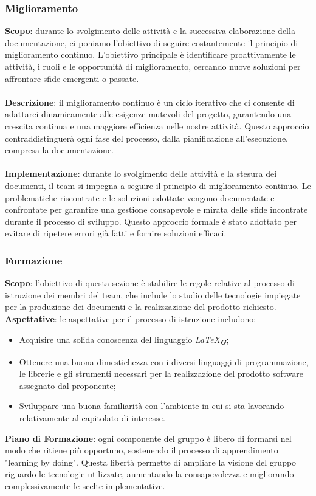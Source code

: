 \subsubsection{Miglioramento}
\textbf{Scopo}: durante lo svolgimento delle attività e la successiva elaborazione della documentazione, ci poniamo l'obiettivo di seguire costantemente il principio di miglioramento continuo. 
L'obiettivo principale è identificare proattivamente le attività, i ruoli e le opportunità di miglioramento, cercando nuove soluzioni per affrontare sfide emergenti o passate.\\ \\
\textbf{Descrizione}: il miglioramento continuo è un ciclo iterativo che ci consente di adattarci dinamicamente alle esigenze mutevoli del progetto, 
garantendo una crescita continua e una maggiore efficienza nelle nostre attività.
Questo approccio contraddistinguerà ogni fase del processo, dalla pianificazione all'esecuzione, compresa la documentazione.\\ \\
\textbf{Implementazione}: durante lo svolgimento delle attività e la stesura dei documenti, il team si impegna a seguire il principio di miglioramento continuo. 
Le problematiche riscontrate e le soluzioni adottate vengono documentate e confrontate per garantire una gestione consapevole e mirata delle sfide incontrate durante il processo di sviluppo. 
Questo approccio formale è stato adottato per evitare di ripetere errori già fatti e fornire soluzioni efficaci.

\subsubsection{Formazione}
\textbf{Scopo}: l'obiettivo di questa sezione è stabilire le regole relative al processo di istruzione dei membri del team, 
che include lo studio delle tecnologie impiegate per la produzione dei documenti e la realizzazione del prodotto richiesto.
\textbf{Aspettative}: le aspettative per il processo di istruzione includono:
\begin{itemize}
    \item Acquisire una solida conoscenza del linguaggio \emph{\LaTeX}\textsubscript{\textit{\textbf{G}}};
    \item Ottenere una buona dimestichezza con i diversi linguaggi di programmazione, le librerie e gli strumenti necessari per la realizzazione del prodotto software assegnato dal proponente;
    \item Sviluppare una buona familiarità con l'ambiente in cui si sta lavorando relativamente al capitolato di interesse.
\end{itemize}
\textbf{Piano di Formazione}: ogni componente del gruppo è libero di formarsi nel modo che ritiene più opportuno, sostenendo il processo di apprendimento "learning by doing". Questa libertà permette di ampliare la visione del gruppo riguardo le tecnologie utilizzate, aumentando la consapevolezza e migliorando complessivamente le scelte implementative.

